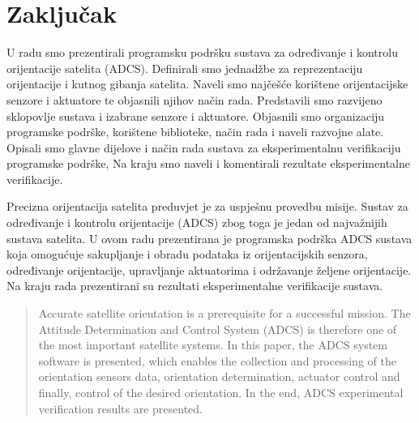 \documentclass[times, utf8, diplomski, numeric]{templates/template}
\begin{document}
\chapter{Zaključak}{
    U radu smo prezentirali programsku podršku sustava za određivanje i kontrolu orijentacije satelita (ADCS). Definirali smo jednadžbe za reprezentaciju orijentacije i kutnog gibanja satelita. Naveli smo najčešće korištene orijentacijske senzore i aktuatore te objasnili njihov način rada. Predstavili smo razvijeno sklopovlje sustava i izabrane senzore i aktuatore. Objasnili smo organizaciju programske podrške, korištene biblioteke, način rada i naveli razvojne alate. Opisali smo glavne dijelove i način rada sustava za eksperimentalnu verifikaciju programske podrške, Na kraju smo naveli i komentirali rezultate eksperimentalne verifikacije.
}




\begin{sazetak}{
    Precizna orijentacija satelita preduvjet je za uspješnu provedbu misije. Sustav za određivanje i kontrolu orijentacije (ADCS) zbog toga je jedan od najvažnijih sustava satelita. U ovom radu prezentirana je programska podrška ADCS sustava koja omogućuje sakupljanje i obradu podataka iz orijentacijskih senzora, određivanje orijentacije, upravljanje aktuatorima i održavanje željene orijentacije. Na kraju rada prezentirani su rezultati eksperimentalne verifikacije sustava. 
}

\end{sazetak}

\begin{abstract}{
    Accurate satellite orientation is a prerequisite for a successful mission. The Attitude Determination and Control System (ADCS) is therefore one of the most important satellite systems. In this paper, the ADCS system software is presented, which enables the collection and processing of the orientation sensors data, orientation determination, actuator control and finally, control of the desired orientation. In the end, ADCS experimental verification results are presented.
}

\end{abstract}
\end{document}
